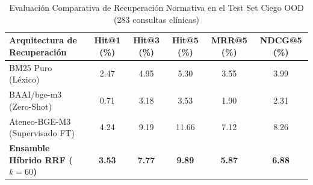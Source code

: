 \begin{table}[t]
\centering
\small
\caption{Evaluación Comparativa de Recuperación Normativa en el Test Set Ciego OOD (283 consultas clínicas)}
\label{tab:blind_retrieval_benchmark}
\begin{tabular}{lccccc}
\toprule
\textbf{Arquitectura de Recuperación} & \textbf{Hit@1 (\%)} & \textbf{Hit@3 (\%)} & \textbf{Hit@5 (\%)} & \textbf{MRR@5 (\%)} & \textbf{NDCG@5 (\%)} \\
\midrule
BM25 Puro (Léxico) & 2.47 & 4.95 & 5.30 & 3.55 & 3.99 \\
BAAI/bge-m3 (Zero-Shot) & 0.71 & 3.18 & 3.53 & 1.90 & 2.31 \\
Ateneo-BGE-M3 (Supervisado FT) & 4.24 & 9.19 & 11.66 & 7.12 & 8.26 \\
\textbf{Ensamble Híbrido RRF ($k=60$)} & \textbf{3.53} & \textbf{7.77} & \textbf{9.89} & \textbf{5.87} & \textbf{6.88} \\
\bottomrule
\end{tabular}
\end{table}
